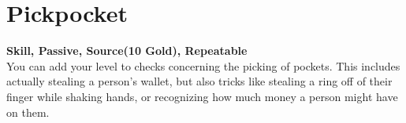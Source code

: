 \section{Pickpocket}\label{sec:pickpocket}
\textbf{Skill, Passive, Source(10 Gold), Repeatable}\\
You can add your level to checks concerning the picking of pockets. This includes actually stealing a person's wallet, but also tricks like stealing a ring off of their finger while shaking hands, or recognizing  how much money a person might have on them.